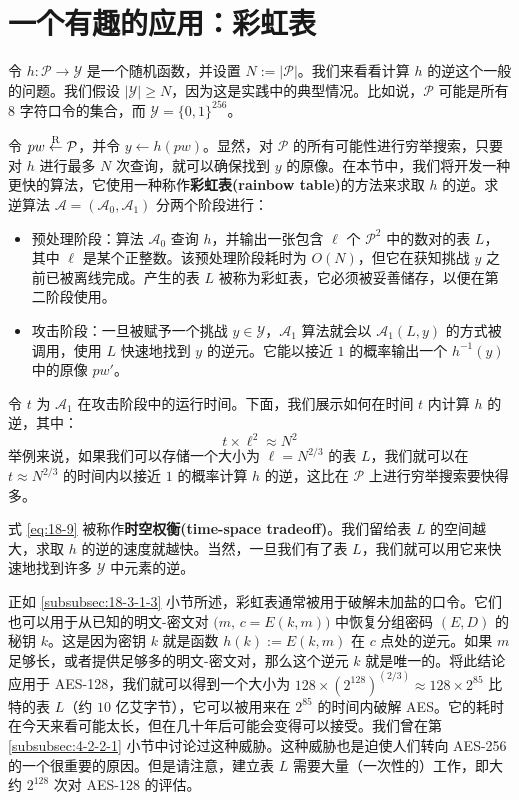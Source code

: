 \section{一个有趣的应用：彩虹表}\label{sec:18-7}

令 $h:\mathcal{P}\to\mathcal{Y}$ 是一个随机函数，并设置 $N:=|\mathcal{P}|$。我们来看看计算 $h$ 的逆这个一般的问题。我们假设 $|\mathcal{Y}|\geq N$，因为这是实践中的典型情况。比如说，$\mathcal{P}$ 可能是所有 $8$ 字符口令的集合，而 $\mathcal{Y}=\{0,1\}^{256}$。

令 $pw\overset{\rm R}\leftarrow\mathcal{P}$，并令 $y\leftarrow h(pw)$。显然，对 $\mathcal{P}$ 的所有可能性进行穷举搜索，只要对 $h$ 进行最多 $N$ 次查询，就可以确保找到 $y$ 的原像。在本节中，我们将开发一种更快的算法，它使用一种称作\textbf{彩虹表(rainbow table)}的方法来求取 $h$ 的逆。求逆算法 $\mathcal{A}=(\mathcal{A}_0,\mathcal{A}_1)$ 分两个阶段进行：
\begin{itemize}
	\item 预处理阶段：算法 $\mathcal{A}_0$ 查询 $h$，并输出一张包含 $\ell$ 个 $\mathcal{P}^2$ 中的数对的表 $L$，其中 $\ell$ 是某个正整数。该预处理阶段耗时为 $O(N)$，但它在获知挑战 $y$ 之前已被离线完成。产生的表 $L$ 被称为彩虹表，它必须被妥善储存，以便在第二阶段使用。
	\item 攻击阶段：一旦被赋予一个挑战 $y\in\mathcal{Y}$，$\mathcal{A}_1$ 算法就会以 $\mathcal{A}_1(L,y)$ 的方式被调用，使用 $L$ 快速地找到 $y$ 的逆元。它能以接近 $1$ 的概率输出一个 $h^{-1}(y)$ 中的原像 $pw'$。
\end{itemize}
令 $t$ 为 $\mathcal{A}_1$ 在攻击阶段中的运行时间。下面，我们展示如何在时间 $t$ 内计算 $h$ 的逆，其中：
\begin{equation}\label{eq:18-9}
t\times\ell^2\approx N^2
\end{equation}
举例来说，如果我们可以存储一个大小为 $\ell=N^{2/3}$ 的表 $L$，我们就可以在 $t\approx N^{2/3}$ 的时间内以接近 $1$ 的概率计算 $h$ 的逆，这比在 $\mathcal{P}$ 上进行穷举搜索要快得多。

式 \ref{eq:18-9} 被称作\textbf{时空权衡(time-space tradeoff)}。我们留给表 $L$ 的空间越大，求取 $h$ 的逆的速度就越快。当然，一旦我们有了表 $L$，我们就可以用它来快速地找到许多 $\mathcal{Y}$ 中元素的逆。

正如 \ref{subsubsec:18-3-1-3} 小节所述，彩虹表通常被用于破解未加盐的口令。它们也可以用于从已知的明文-密文对 $\big(m,\,c=E(k,m)\big)$ 中恢复分组密码 $(E,D)$ 的秘钥 $k$。这是因为密钥 $k$ 就是函数 $h(k):=E(k,m)$ 在 $c$ 点处的逆元。如果 $m$ 足够长，或者提供足够多的明文-密文对，那么这个逆元 $k$ 就是唯一的。将此结论应用于 AES-128，我们就可以得到一个大小为 $128\times(2^{128})^{(2/3)}\approx 128\times 2^{85}$ 比特的表 $L$（约 $10$ 亿艾字节），它可以被用来在 $2^{85}$ 的时间内破解 AES。它的耗时在今天来看可能太长，但在几十年后可能会变得可以接受。我们曾在第 \ref{subsubsec:4-2-2-1} 小节中讨论过这种威胁。这种威胁也是迫使人们转向 AES-256 的一个很重要的原因。但是请注意，建立表 $L$ 需要大量（一次性的）工作，即大约 $2^{128}$ 次对 AES-128 的评估。

